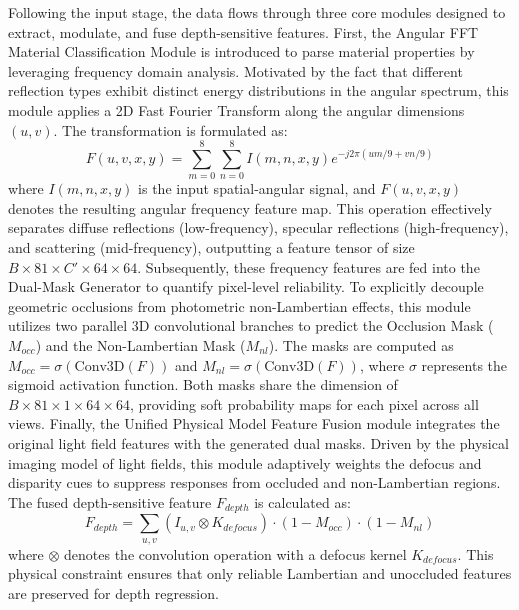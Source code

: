 Following the input stage, the data flows through three core modules designed to extract, modulate, and fuse depth-sensitive features. First, the Angular FFT Material Classification Module is introduced to parse material properties by leveraging frequency domain analysis. Motivated by the fact that different reflection types exhibit distinct energy distributions in the angular spectrum, this module applies a 2D Fast Fourier Transform along the angular dimensions $(u, v)$. The transformation is formulated as:
\begin{equation}
\label{eq:eq18}
F(u,v,x,y) = \sum_{m=0}^{8}\sum_{n=0}^{8} I(m,n,x,y) e^{-j 2\pi (um/9 + vn/9)}
\end{equation}
where $I(m,n,x,y)$ is the input spatial-angular signal, and $F(u,v,x,y)$ denotes the resulting angular frequency feature map. This operation effectively separates diffuse reflections (low-frequency), specular reflections (high-frequency), and scattering (mid-frequency), outputting a feature tensor of size $B \times 81 \times C' \times 64 \times 64$. Subsequently, these frequency features are fed into the Dual-Mask Generator to quantify pixel-level reliability. To explicitly decouple geometric occlusions from photometric non-Lambertian effects, this module utilizes two parallel 3D convolutional branches to predict the Occlusion Mask ($M_{occ}$) and the Non-Lambertian Mask ($M_{nl}$). The masks are computed as $M_{occ} = \sigma(\text{Conv3D}(F))$ and $M_{nl} = \sigma(\text{Conv3D}(F))$, where $\sigma$ represents the sigmoid activation function. Both masks share the dimension of $B \times 81 \times 1 \times 64 \times 64$, providing soft probability maps for each pixel across all views. Finally, the Unified Physical Model Feature Fusion module integrates the original light field features with the generated dual masks. Driven by the physical imaging model of light fields, this module adaptively weights the defocus and disparity cues to suppress responses from occluded and non-Lambertian regions. The fused depth-sensitive feature $F_{depth}$ is calculated as:
\begin{equation}
\label{eq:eq19}
F_{depth} = \sum_{u,v} (I_{u,v} \otimes K_{defocus}) \cdot (1 - M_{occ}) \cdot (1 - M_{nl})
\end{equation}
where $\otimes$ denotes the convolution operation with a defocus kernel $K_{defocus}$. This physical constraint ensures that only reliable Lambertian and unoccluded features are preserved for depth regression.

